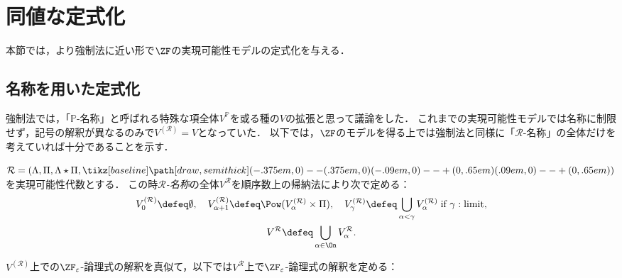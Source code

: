 \documentclass[realisability.tex]{subfiles}
\begin{document}
\section{同値な定式化}
本節では，より強制法に近い形で$\ZF$の実現可能性モデルの定式化を与える．
\subsection{名称を用いた定式化}
強制法では，「$\mathbb{P}$-名称」と呼ばれる特殊な項全体$V^{\mathbb{P}}$を或る種の$V$の拡張と思って議論をした．
これまでの実現可能性モデルでは名称に制限せず，記号の解釈が異なるのみで$V^{(\mathcal{R})} = V$となっていた．
以下では，$\ZF$のモデルを得る上では強制法と同様に「$\mathcal{R}$-名称」の全体だけを考えていれば十分であることを示す．

\begin{definition}
 $\mathcal{R} = (\Lambda, \Pi, \Lambda \star \Pi, \pole)$を実現可能性代数とする．
 この時\emph{$\mathcal{R}$-名称}の全体$V^{\mathcal{R}}$を順序数上の帰納法により次で定める：
 \begin{gather*}
  V_0^{(\mathcal{R})} \defeq \emptyset, \quad V_{\alpha + 1}^{(\mathcal{R})} \defeq \Pow(V_{\alpha}^{(\mathcal{R})} \times \Pi), \quad V_\gamma^{(\mathcal{R})} \defeq \bigcup_{\alpha < \gamma} V_\alpha^{(\mathcal{R})}\; \text{if } \gamma: \text{limit},\\
  V^{\mathcal{R}} \defeq \bigcup_{\alpha \in \On} V^{\mathcal{R}}_\alpha.
 \end{gather*}
\end{definition}

$V^{(\mathcal{R})}$上での$\ZFe$-論理式の解釈を真似て，以下では$V^{\mathcal{R}}$上で$\ZFe$-論理式の解釈を定める：
\end{document}
